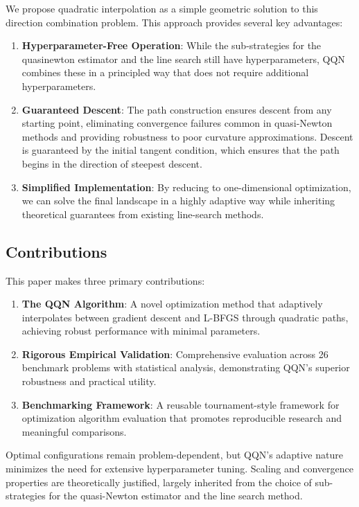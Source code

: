 We propose quadratic interpolation as a simple geometric solution to this direction combination problem.
This approach provides several key advantages:

\begin{enumerate}
\def\labelenumi{\arabic{enumi}.}
\item
  \textbf{Hyperparameter-Free Operation}: While the sub-strategies for the quasinewton estimator and the line search still have hyperparameters, QQN combines these in a principled way that does not require additional hyperparameters.
\item
  \textbf{Guaranteed Descent}: The path construction ensures descent from any starting point, eliminating convergence failures common in quasi-Newton methods and providing robustness to poor curvature approximations.
  Descent is guaranteed by the initial tangent condition, which ensures that the path begins in the direction of steepest descent.
\item
  \textbf{Simplified Implementation}: By reducing to one-dimensional optimization, we can solve the final landscape in a highly adaptive way while inheriting theoretical guarantees from existing line-search methods.
\end{enumerate}

\hypertarget{contributions}{%
\subsection{Contributions}\label{contributions}}

This paper makes three primary contributions:

\begin{enumerate}
\def\labelenumi{\arabic{enumi}.}
\item
  \textbf{The QQN Algorithm}: A novel optimization method that adaptively interpolates between gradient descent and L-BFGS through quadratic paths, achieving robust performance with minimal parameters.
\item
  \textbf{Rigorous Empirical Validation}: Comprehensive evaluation across 26 benchmark problems with statistical analysis, demonstrating QQN's superior robustness and practical utility.
\item
  \textbf{Benchmarking Framework}: A reusable tournament-style framework for optimization algorithm evaluation that promotes reproducible research and meaningful comparisons.
\end{enumerate}

Optimal configurations remain problem-dependent, but QQN's adaptive nature minimizes the need for extensive hyperparameter tuning.
Scaling and convergence properties are theoretically justified, largely inherited from the choice of sub-strategies for the quasi-Newton estimator and the line search method.

